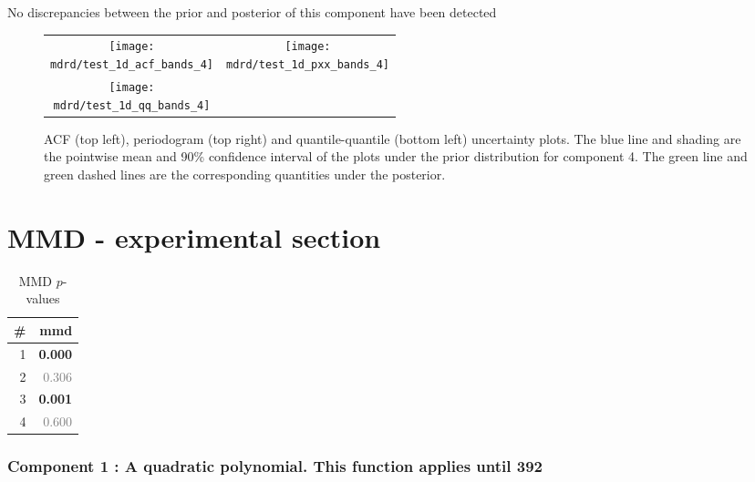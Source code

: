 \documentclass{article} %
\begin{document}
No discrepancies between the prior and posterior of this component have been detected

\begin{figure}[H]
\newcommand{\wmgd}{0.5\columnwidth}
\newcommand{\hmgd}{3.0cm}
\newcommand{\mdrd}{test_1d}
\newcommand{\mbm}{\hspace{-0.3cm}}
\begin{tabular}{cc}
\mbm \texttt{[image: \\mdrd/test\_1d\_acf\_bands\_4]} & \texttt{[image: \\mdrd/test\_1d\_pxx\_bands\_4]} \\
\mbm \texttt{[image: \\mdrd/test\_1d\_qq\_bands\_4]}
\end{tabular}
\caption{
ACF (top left), periodogram (top right) and quantile-quantile (bottom left) uncertainty plots.
The blue line and shading are the pointwise mean and 90\% confidence interval of the plots under the prior distribution for component 4.
The green line and green dashed lines are the corresponding quantities under the posterior.}
\label{fig:check4}
\end{figure}

\section{MMD - experimental section}
\label{sec:mmd}

\begin{table}[htb]
\begin{center}
{\small
\begin{tabular}{|r|r|}
\hline
\bf{\#} & {mmd}\\
\hline

1 & \textbf{0.000}\\

2 & \textcolor{gray}{0.306}\\

3 & \textbf{0.001}\\

4 & \textcolor{gray}{0.600}\\

\hline
\end{tabular}
\caption{
MMD $p$-values
}
\label{table:mmd}
}
\end{center}
\end{table}

\subsubsection{Component 1 : A quadratic polynomial. This function applies until  392}
\end{document}
